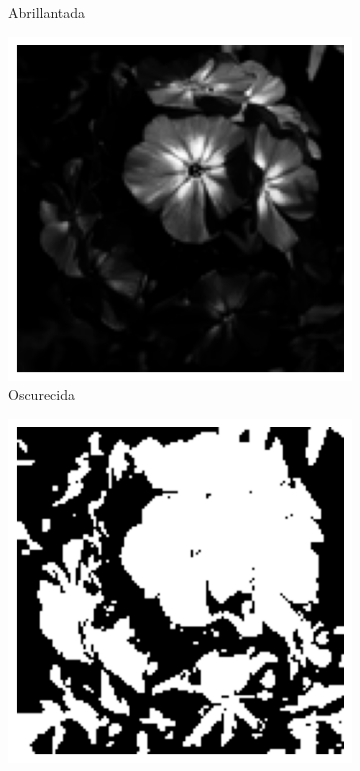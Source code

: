 \documentclass{article}
\begin{document}
\begin{figure}
\begin{subfigure}[b]{0.24\textwidth}
		\caption{Abrillantada}
		\label{fg:imgGrau0p4exp}
	\end{subfigure}
	\begin{subfigure}[b]{0.24\textwidth}
		\includegraphics[width= \textwidth]{imgGrau3p5exp}
		\caption{Oscurecida}
		\label{fg:imgGrau3p5exp}
	\end{subfigure}
	\begin{subfigure}[b]{0.24\textwidth}
		\includegraphics[width= \textwidth]{imgGrau0binarizada}

\end{subfigure}
\end{figure}
\end{document}
